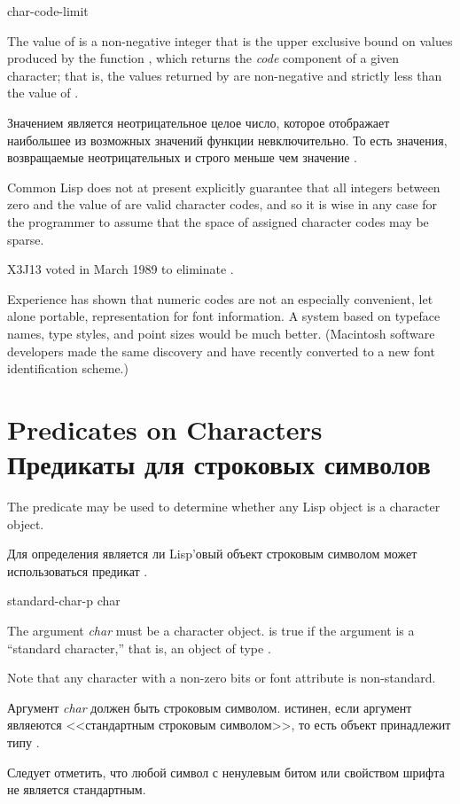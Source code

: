 \begin{defun}[Constant]
char-code-limit

The value of  is a non-negative
integer that is the upper exclusive bound on values produced
by the function , which returns the \emph{code} component
of a given character; that is, the values returned by 
are non-negative and strictly less than the value of
.

Значением  является неотрицательное целое число, которое
отображает наибольшее из возможных значений функции 
невключительно. То есть значения, возвращаемые  неотрицательных и
строго меньше чем значение .

\begin{new}
Common Lisp does not at present explicitly guarantee that all integers between
zero and the value of  are valid character codes, and so
it is wise in any case for the programmer to assume that the space of
assigned character codes may be sparse.
\end{new}
\end{defun}

\begin{newer}
X3J13 voted in March 1989 
to eliminate .

Experience has shown that numeric codes are not an especially
convenient, let alone portable, representation for font information.
A system based on typeface names, type styles, and point sizes would be much better.
(Macintosh software developers made the same discovery and have recently
converted to a new font identification scheme.)
\end{newer}

\section{Predicates on Characters Предикаты для строковых символов}

The predicate  may be used to determine
whether any Lisp object is a character object.

Для определения является ли
Lisp'овый объект строковым символом может использоваться предикат
. 

\begin{defun}[Function]
standard-char-p char

The argument \emph{char} must be a character object.
 is true if the argument is a ``standard character,''
that is, an object of type .

Note that any character with a non-zero bits or
font attribute is non-standard.

Аргумент \emph{char} должен быть строковым символом.
 истинен, если аргумент являеются <<стандартным строковым
символом>>, то есть объект принадлежит типу .

Следует отметить, что любой символ с ненулевым битом или свойством шрифта не
является стандартным.
\end{defun}

